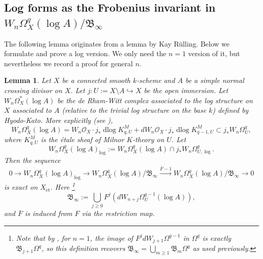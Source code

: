 \documentclass[11pt]{amsart}
\newcommand{\ra}{\rightarrow}
\newcommand{\sB}{\mathfrak{B}}
\newcommand{\cO}{\mathcal{O}}
\newcommand{\xra}{\xrightarrow}
\newcommand{\dlog}{\operatorname{dlog}}
\newcommand{\hra}{\hookrightarrow}
\newcommand{\et}{{\operatorname{\acute{e}t}}}
\renewcommand{\bar}{\overline}
\theoremstyle{plain}
\newtheorem{lem}[prop]{Lemma}
\theoremstyle{definition}
\numberwithin{equation}{prop}
\begin{document}
\subsection{Log forms as the Frobenius invariant in $W_n\Omega^q_X(\log A)/\sB_\infty$}
The following lemma originates from a lemma by Kay Rülling. 
Below we formulate and prove a log version.
We only need the $n=1$ version of it, but nevertheless we record a
proof for general $n$.


\begin{lem}
\label{sesF-1Binf}
Let $X$ be a connected smooth $k$-scheme and $A$ be a simple normal crossing divisor on $X$. 
Let $j:U:=X\setminus A\hra X$ be the open immersion.
Let $W_n\Omega^*_{X}(\log A)$ be the de Rham-Witt complex associated to the log structure on $X$ associated to $A$ (relative to the trivial log structure on the base $k$) defined by Hyodo-Kato.
More explicitly (see \cite[Proposition 4.6]{HK}),
$$W_n\Omega^q_{X}(\log A)
=
W_n\cO_X\cdot j_*\dlog K^M_{q,U}+dW_n\cO_X\cdot j_*\dlog K^M_{q-1,U}
\subset j_*W_n\Omega^q_{U},$$
where $K^M_{q,U}$ is the \'etale sheaf of Milnor $K$-theory on $U$.
Let 
$$W_n\Omega^q_{X}(\log A)_{\log}:=W_n\Omega^q_{X}(\log A)\cap j_*W_n\Omega^q_{U,\log}.$$
Then the sequence 
$$0\ra W_n\Omega^q_{X}(\log A)_{\log}\ra W_n\Omega^q_X(\log A)/\sB_\infty\xra{\bar F-1} W_n\Omega^q_X(\log A)/\sB_\infty\ra 0$$
is exact on $X_\et.$
Here 
\footnote{Note that by \cite[I.3.11.4]{IlDRW}, for $n=1$, the image of $F^j d W_{j+1}\Omega^{q-1}$ in $\Omega^q$ is exactly $\sB_{j+1}\Omega^q$, so this definition recovers $\sB_\infty = \bigcup_{m\ge 1} \sB_m\Omega^q$ as used previously.}
$$\sB_\infty:=\bigcup_{j\ge 0}F^j(dW_{n+j}\Omega^{q-1}_U(\log A)),$$
and $\bar F$ is induced from $F$ via the restriction map.
\end{lem}
\end{document}
